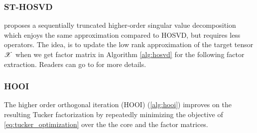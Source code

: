 \subsubsection{ST-HOSVD} 
\cite{vannieuwenhoven2012new} proposes a sequentially truncated higher-order singular value decomposition which enjoys the same approximation compared to HOSVD, but requires less operators. The idea, is to update the low rank approximation of the target tensor $\T{X}$ when we get factor matrix in Algorithm \ref{alg:hosvd} for the following factor extraction. Readers can go to \cite{vannieuwenhoven2012new} for more details. 


\subsubsection{HOOI}
The higher order orthogonal iteration (HOOI) \cite{de2000multilinear} (\ref{alg:hooi})
improves on the resulting Tucker factorization
by repeatedly minimizing the objective of \ref{eq:tucker_optimization}
over the the core and the factor matrices.
